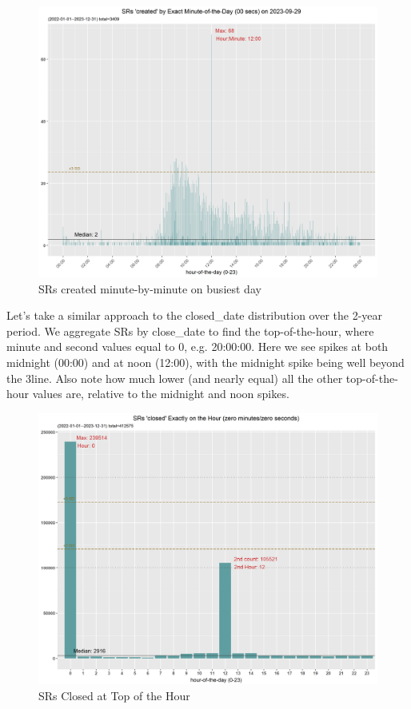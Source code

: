 \documentclass[12pt, titlepage]{article}
\begin{document}
	\begin{figure}[H]
		 \centering
		 \includegraphics[width=\textwidth]{SR_created_by_minute_of_busiest_day.png}
		 \caption{SRs created minute-by-minute on busiest day}
		 \label{fig:busiestcreated}
	\end{figure}	

	Let's take a similar approach to the closed\_date distribution over the 2-year period. We aggregate 
	SRs by close\_date to find the top-of-the-hour, where minute and second values equal to 0, e.g. 20:00:00. 
	Here we see spikes at both midnight (00:00) and at noon (12:00), with the midnight spike being 
	well beyond the 3\textsigma line. Also note how much lower (and nearly equal) all the other
	top-of-the-hour values are, relative to the midnight and noon spikes. 
	
	\begin{figure}[H]
		 \centering
		 \includegraphics[scale = 0.65]{SR_closed_by_top_of_hour.png}
		 \caption{SRs Closed at Top of the Hour}
		 \label{fig:tophourclosed}
	\end{figure}
	
\end{document}

